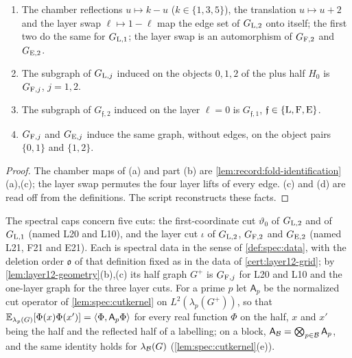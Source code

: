 \begin{lemma}\label{lem:layer12-geometry}
\leavevmode
\begin{enumerate}[label=(\alph*)]
\item The chamber reflections $u\mapsto k-u$ ($k\in\{1,3,5\}$), the translation
 $u\mapsto u+2$ and the layer swap $\ell\mapsto1-\ell$ map the edge set of
 $G_{\rm L,2}$ onto itself; the first two do the same for $G_{\rm L,1}$; the
 layer swap is an automorphism of $G_{\rm F,2}$ and $G_{\rm E,2}$.
\item The subgraph of $G_{{\rm L},j}$ induced on the objects $0,1,2$ of the
 plus half $H_0$ is $G_{{\rm F},j}$, $j=1,2$.
\item The subgraph of $G_{\mathfrak f,2}$ induced on the layer $\ell=0$ is
 $G_{\mathfrak f,1}$, $\mathfrak f\in\{\rm L,F,E\}$.
\item $G_{{\rm F},j}$ and $G_{{\rm E},j}$ induce the same graph, without
 edges, on the object pairs $\{0,1\}$ and $\{1,2\}$.
\end{enumerate}
\end{lemma}

\begin{proof}
The chamber maps of (a) and part (b) are
\cref{lem:record:fold-identification}(a),(c); the layer swap permutes the
four layer lifts of every edge. (c) and (d) are read off from the
definitions. The script 
reconstructs these facts.
\end{proof}

The spectral caps concern five cuts: the first-coordinate cut $\vartheta_0$
of $G_{\rm L,2}$ and of $G_{\rm L,1}$ (named L20 and L10), and the layer
cut $\iota$ of $G_{\rm L,2}$, $G_{\rm F,2}$ and $G_{\rm E,2}$ (named L21, F21
and E21). Each is spectral data in the sense of \cref{def:spec:data}, with the
deletion order $\mathfrak o$ of that definition fixed as in the data of
\cref{cert:layer12-grid}; by \cref{lem:layer12-geometry}(b),(c) its half
graph $G^+$ is $G_{{\rm F},j}$ for L20 and L10 and the one-layer graph for
the three layer cuts. For a prime $p$ let $\mathsf A_p$ be the normalized
cut operator of \cref{lem:spec:cutkernel} on $L^2(\lambda_p(G^+))$, so that
$\mathbb E_{\lambda_p(G)}[\Phi(x)\Phi(x')]=\left\langle \Phi,\mathsf A_p\Phi\right\rangle$ for every real
function $\Phi$ on the half, $x$ and $x'$ being the half and the reflected
half of a labelling; on a block, $\mathsf A_{\mathcal B}=\bigotimes_{p\in\mathcal B}\mathsf A_p$,
and the same identity holds for $\lambda_{\mathcal B}(G)$
(\cref{lem:spec:cutkernel}(e)).


